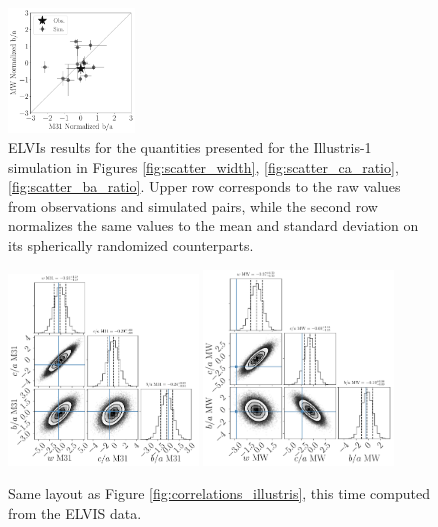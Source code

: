 \documentclass[a4paper,fleqn,usenatbib]{mnras}
\begin{document}
\begin{figure}
\includegraphics[width=0.30\textwidth]{scatter_norm_ranked_elvis_ba_ratio.pdf}
\caption{ELVIs results for the quantities presented for the Illustris-1
  simulation in Figures  \ref{fig:scatter_width},
  \ref{fig:scatter_ca_ratio}, \ref{fig:scatter_ba_ratio}.
Upper row corresponds to the raw values from observations and
simulated pairs, while the second row normalizes the same values to
the mean and standard deviation on its spherically randomized
counterparts. 
\label{fig:scatter_elvis}}
\end{figure}

\begin{figure}
\centering
\includegraphics[width=0.45\textwidth]{gaussian_model_elvis_M31.pdf}
\includegraphics[width=0.45\textwidth]{gaussian_model_elvis_MW.pdf}
\caption{
Same layout as Figure \ref{fig:correlations_illustris}, this time
computed from the ELVIS data.
\label{fig:correlations_elvis}}
\end{figure}
\end{document}

